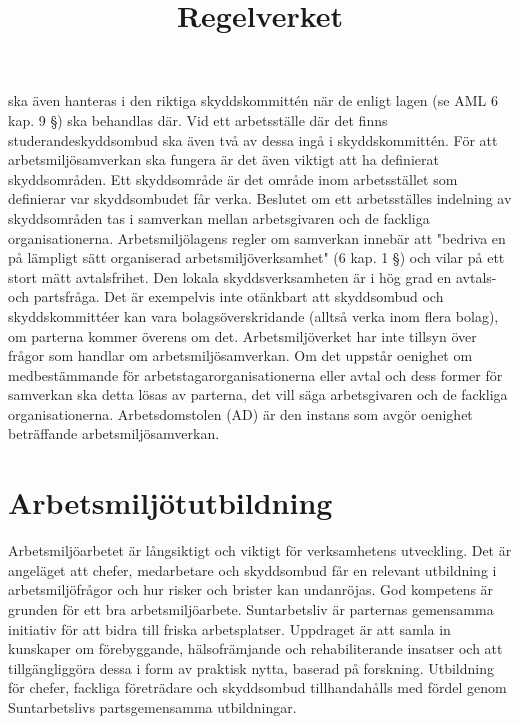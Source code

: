 ska även hanteras i den riktiga skyddskommittén när de enligt lagen (se AML 6 kap. 9 §) ska behandlas där. Vid ett arbetsställe där det finns studerandeskyddsombud ska även två av dessa ingå i skyddskommittén.
För att arbetsmiljösamverkan ska fungera är det även viktigt att ha definierat skyddsområden. Ett skyddsområde är det område inom arbetsstället som definierar var skyddsombudet får verka. Beslutet om ett arbetsställes indelning av skyddsområden tas i samverkan mellan arbetsgivaren och de fackliga organisationerna.
Arbetsmiljölagens regler om samverkan innebär att "bedriva en på lämpligt sätt organiserad arbetsmiljöverksamhet" (6 kap. 1 §) och vilar på ett stort mätt avtalsfrihet. Den lokala skyddsverksamheten är i hög grad en avtals- och partsfråga. Det är exempelvis inte otänkbart att skyddsombud och skyddskommittéer kan vara bolagsöverskridande (alltså verka inom flera bolag), om parterna kommer överens om det.
Arbetsmiljöverket har inte tillsyn över frågor som handlar om arbetsmiljösamverkan. Om det uppstår oenighet om medbestämmande för arbetstagarorganisationerna eller avtal och dess former för samverkan ska detta lösas av parterna, det vill säga arbetsgivaren och de fackliga organisationerna. Arbetsdomstolen (AD) är den instans som avgör oenighet beträffande arbetsmiljösamverkan.
\section*{Arbetsmiljötutbildning}
Arbetsmiljöarbetet är långsiktigt och viktigt för verksamhetens utveckling. Det är angeläget att chefer, medarbetare och skyddsombud får en relevant utbildning i arbetsmiljöfrågor och hur risker och brister kan undanröjas. God kompetens är grunden för ett bra arbetsmiljöarbete.
Suntarbetsliv är parternas gemensamma initiativ för att bidra till friska arbetsplatser. Uppdraget är att samla in kunskaper om förebyggande, hälsofrämjande och rehabiliterande insatser och att tillgängliggöra dessa i form av praktisk nytta, baserad på forskning. Utbildning för chefer, fackliga företrädare och skyddsombud tillhandahålls med fördel genom Suntarbetslivs partsgemensamma utbildningar.

\title{
Regelverket
}

